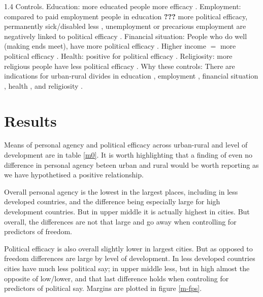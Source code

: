 \documentclass[10pt, letterpaper]{article}
\begin{document}
\begin{spacing}{1.4}
Controls. Education: more educated people more efficacy
\citep{emmenegger2015labour,garcia2024they,marx2016unemployed,rowland2024political}.
Employment: compared to paid employment people in education \textbf{???}  more political efficacy,
permanently sick/disabled less \citep{luukkonen2022urbanisation}, unemployment or
precarious employment are negatively linked to political efficacy
\citep{emmenegger2015labour,marx2016unemployed}. Financial situation: People who
do well (making ends meet), have more political efficacy
\citep{luukkonen2022urbanisation,marx2016unemployed}. Higher income $=$ more
political efficacy \citep{emmenegger2015labour,rowland2024political}. 
 Health: positive for political efficacy
 \citep{garcia2024they,gidengil2024healthy,shore2019health}.
 Religiosity: more religious people have less political efficacy \citep{marx2016unemployed,rowland2024political}.
 Why these controls: There are indications for urban-rural divides
 in education \citep{van2021urban,zahl2024spatial},
 employment  \citep{e26,ananian2024employment},
 financial situation
 \citep{kpatcha2026unlocking,meloni2024rural,finnemann2024urban},
 health \citep{mackinnon2023mapping,menashe2022shifting},
 and religiosity 
 \citep{balazka2020mapping,meulemann2020secularization}.



\section{Results}

Means of personal agency and political efficacy across urban-rural and level of
development are in table \ref{m0}. It is worth highlighting that a finding of even no difference
 in personal agency beteen urban and rural would be worth reporting as we have hypothetised a
positive relationship.  

Overall personal agency is the lowest in the largest places,
including in less developed countries, and 
the difference being especially large for high development countries.
But  in upper middle it is actually highest in cities. But overall, the
differences are not that large and go away when controlling for predictors of freedom.

Political efficacy is also overall slightly lower in largest cities. But as opposed
to freedom differences are large by level of development. In less developed
countries cities have much less political say; in upper middle less, but in high
almost the opposite of low/lower, and that last difference holds when controling
for predictors of political say. Margins are plotted in figure \ref{m-fps}.


\end{spacing}
\end{document}
